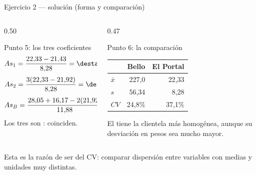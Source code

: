 \documentclass[aspectratio=169,10pt]{beamer}
\begin{document}
\begin{frame}{Ejercicio 2 — solución (forma y comparación)}
  \scriptsize
  \begin{columns}[T,onlytextwidth]
    \begin{column}{0.50\textwidth}
      \begin{block}{Punto 5: los tres coeficientes}
        \scriptsize
        \[ As_1 = \frac{22{,}33-21{,}43}{8{,}28} = \destacar{0{,}109} \]
        \[ As_2 = \frac{3(22{,}33-21{,}92)}{8{,}28} = \destacar{0{,}149} \]
        \[ As_B = \frac{28{,}05+16{,}17-2(21{,}92)}{11{,}88}
                = \destacar{0{,}031} \]
        Los tres son : coinciden.
      \end{block}
    \end{column}
    \begin{column}{0.47\textwidth}
      \begin{exampleblock}{Punto 6: la comparación}
        \scriptsize
        \begin{tabular}{@{}lrr@{}}
          \toprule
          & \textbf{Bello} & \textbf{El Portal} \\
          \midrule
          $\bar{x}$ & 227{,}0 & 22{,}33 \\
          $s$       &  56{,}34 &  8{,}28 \\
          $CV$      & 24{,}8\% & 37{,}1\% \\
          \bottomrule
        \end{tabular}
        \vspace{0.1cm}
        El  tiene la clientela más homogénea, aunque
        su desviación en pesos sea mucho mayor.
      \end{exampleblock}
    \end{column}
  \end{columns}

  \vspace{0.05cm}
  {\tiny\color{uniGris} Esta es la razón de ser del CV: comparar dispersión
  entre variables con medias y unidades muy distintas.}
\end{frame}
\end{document}
